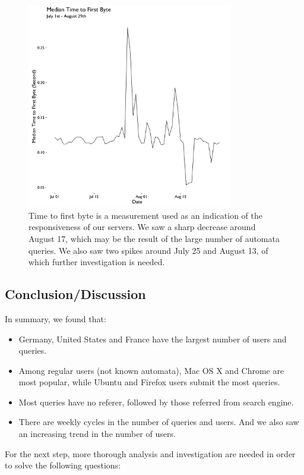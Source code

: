 \documentclass[12pt,]{article}
\providecommand{\tightlist}{%
  \setlength{\itemsep}{0pt}\setlength{\parskip}{0pt}}
\begin{document}
\begin{figure}[H]
\centering
\includegraphics[width=9cm,height=9cm,keepaspectratio]{figures/median_time_firstbyte_ts.png}
\caption{Time to first byte is a measurement used as an indication of
the responsiveness of our servers. We saw a sharp decrease around August
17, which may be the result of the large number of automata queries. We
also saw two spikes around July 25 and August 13, of which further
investigation is needed.}
\end{figure}

\newpage

\subsection{Conclusion/Discussion}\label{conclusiondiscussion}

In summary, we found that:

\begin{itemize}
\tightlist
\item
  Germany, United States and France have the largest number of users and
  queries.
\item
  Among regular users (not known automata), Mac OS X and Chrome are most
  popular, while Ubuntu and Firefox users submit the most queries.
\item
  Most queries have no referer, followed by those referred from search
  engine.
\item
  There are weekly cycles in the number of queries and users. And we
  also saw an increasing trend in the number of users.
\end{itemize}

For the next step, more thorough analysis and investigation are needed
in order to solve the following questions:
\end{document}
